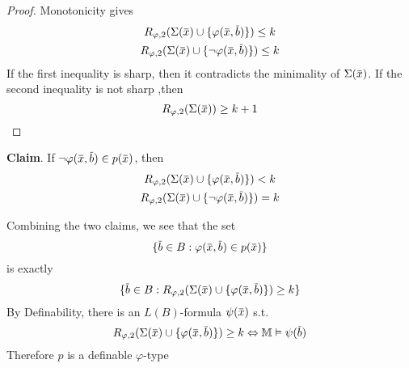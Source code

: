 \documentclass[11pt]{article}
\begin{document}
\begin{proof}
Monotonicity gives
\begin{gather*}
R_{\varphi,2}(\Sigma(\barx)\cup\{\varphi(\barx,\barb)\})\le k\\
R_{\varphi,2}(\Sigma(\barx)\cup\{\neg\varphi(\barx,\barb)\})\le k
\end{gather*}
If the first inequality is sharp, then it contradicts the minimality of \(\Sigma(\barx)\). If the
second inequality is not sharp ,then
\begin{equation*}
R_{\varphi,2}(\Sigma(\barx))\ge k+1
\end{equation*}
\end{proof}

\textbf{Claim}. If \(\neg\varphi(\barx,\barb)\in p(\barx)\), then
\begin{gather*}
R_{\varphi,2}(\Sigma(\barx)\cup\{\varphi(\barx,\barb)\})<k\\
R_{\varphi,2}(\Sigma(\barx)\cup\{\neg\varphi(\barx,\barb)\})=k
\end{gather*}

Combining the two claims, we see that the set
\begin{equation*}
\{\barb\in B:\varphi(\barx,\barb)\in p(\barx)\}
\end{equation*}
is exactly
\begin{equation*}
\{\barb\in B:R_{\varphi,2}(\Sigma(\barx)\cup\{\varphi(\barx,\barb)\})\ge k\}
\end{equation*}
By Definability, there is an \(L(B)\)-formula \(\psi(\barx)\) s.t.
\begin{equation*}
R_{\varphi,2}(\Sigma(\barx)\cup\{\varphi(\barx,\barb)\})\ge k\Leftrightarrow\M\vDash\psi(\barb)
\end{equation*}
Therefore \(p\) is a definable \(\varphi\)-type
\end{document}
